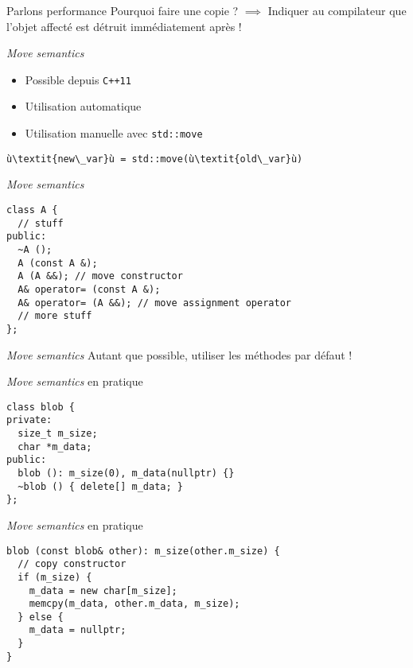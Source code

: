 \begin{frame}{Parlons performance}
  Pourquoi faire une copie ?
  $\implies$ Indiquer au compilateur que l'objet affecté est détruit immédiatement après !
\end{frame}

\begin{frame}[fragile]{\textit{Move semantics}}
  \begin{itemize}
  \item Possible depuis \texttt{C++11}
  \item Utilisation automatique
  \item Utilisation manuelle avec \texttt{std::move}
  \end{itemize}  
  \begin{lstlisting}[escapechar=ù]
ù\textit{new\_var}ù = std::move(ù\textit{old\_var}ù)
  \end{lstlisting}
\end{frame}

\begin{frame}[fragile]{\textit{Move semantics}}
  \begin{lstlisting}
class A {
  // stuff
public:
  ~A ();
  A (const A &);
  A (A &&); // move constructor
  A& operator= (const A &);
  A& operator= (A &&); // move assignment operator
  // more stuff
};
  \end{lstlisting}
\end{frame}

\begin{frame}{\textit{Move semantics}}
  Autant que possible, utiliser les méthodes par défaut !
\end{frame}

\begin{frame}[fragile]{\textit{Move semantics} en pratique}
  \begin{lstlisting}
class blob {
private:
  size_t m_size;
  char *m_data;
public:
  blob (): m_size(0), m_data(nullptr) {}
  ~blob () { delete[] m_data; }
};
  \end{lstlisting}
\end{frame}

\begin{frame}[fragile]{\textit{Move semantics} en pratique}
  \begin{lstlisting}
blob (const blob& other): m_size(other.m_size) {
  // copy constructor
  if (m_size) {
    m_data = new char[m_size];
    memcpy(m_data, other.m_data, m_size);
  } else {
    m_data = nullptr;
  }
}
  \end{lstlisting}
\end{frame}

